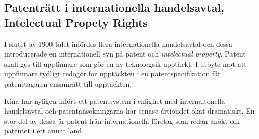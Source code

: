 \subsection{Patenträtt i internationella handelsavtal, Intelectual Propety Rights}

I slutet av 1900-talet infördes flera internationella handelsavtal och dessa introducerade en
internationell syn på patent och \emph{intelectual property}. Patent skall ges till uppfinnare som gör en
ny teknologsik upptäckt. I utbyte mot att uppfinnare tydligt redogör för upptäckten i en
patentspecifikation får patenttagaren ensamrätt till upptäckten. %

Kina har nyligen infört ett patentsystem i enlighet med internaitonella handelsavtal och patentansökningarna har senase årtiondet ökat dramatiskt. En stor del av dessa är patent från internationella företag som redan anökt om patentet i ett annat land.

%
%
%
